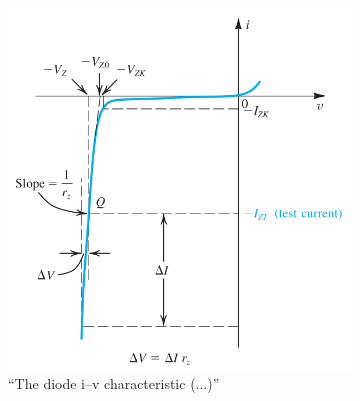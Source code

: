 \vspace{-0.5em}
\begin{figure}[H]
    \begin{subfigure}{0.5\textwidth}
        \centering
        \includegraphics[width=\linewidth]{img/2/zener-diode-iv.png}
        \caption{``The diode i–v characteristic (...)''\cite{sedra-smith:microelectronic-circuits}}
    \end{subfigure}
    \begin{subfigure}{0.45\textwidth}
        \centering
\end{subfigure}
\end{figure}
